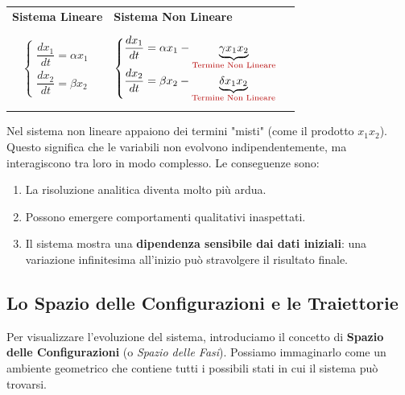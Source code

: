 \documentclass[openany]{book}
\theoremstyle{definition}
\theoremstyle{remark}
\begin{document}
\begin{center}
\begin{tabular}{p{} | p{}}
    \centering \textbf{Sistema Lineare} & \centering \textbf{Sistema Non Lineare} \tabularnewline
    \vspace{-0.2cm}
    \begin{equation*}
        \begin{cases}
            \dfrac{dx_1}{dt} = \alpha x_1 \\[1em]
            \dfrac{dx_2}{dt} = \beta x_2
        \end{cases}
    \end{equation*} & 
    \vspace{-0.2cm}
    \begin{equation*}
        \begin{cases}
            \dfrac{dx_1}{dt} = \alpha x_1 - \underbrace{\gamma x_1 x_2}_{\text{\color{notered}Termine Non Lineare}} \\[1em]
            \dfrac{dx_2}{dt} = \beta x_2 - \underbrace{\delta x_1 x_2}_{\text{\color{notered}Termine Non Lineare}}
        \end{cases}
    \end{equation*}
\end{tabular}
\end{center}

Nel sistema non lineare appaiono dei termini "misti" (come il prodotto $x_1 x_2$). Questo significa che le variabili non evolvono indipendentemente, ma interagiscono tra loro in modo complesso. Le conseguenze sono:
\begin{enumerate}
    \item La risoluzione analitica diventa molto più ardua.
    \item Possono emergere comportamenti qualitativi inaspettati.
    \item Il sistema mostra una \textbf{dipendenza sensibile dai dati iniziali}: una variazione infinitesima all'inizio può stravolgere il risultato finale.
\end{enumerate}

\subsection{Lo Spazio delle Configurazioni e le Traiettorie}

Per visualizzare l'evoluzione del sistema, introduciamo il concetto di \textbf{Spazio delle Configurazioni} (o \textit{Spazio delle Fasi}). Possiamo immaginarlo come un ambiente geometrico che contiene tutti i possibili stati in cui il sistema può trovarsi.
\end{document}
